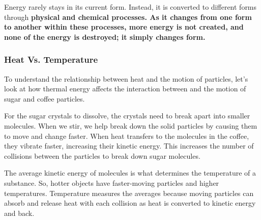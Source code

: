 Energy rarely stays in its current form. Instead, it is converted to different
forms through \bf{physical} and \bf{chemical} processes. As it changes
from one form to another within these processes, more energy is not created, and
none of the energy is destroyed; it simply changes form.

\subsubsection*{Heat Vs. Temperature}

To understand the relationship between heat and the motion of particles, let's
look at how thermal energy affects the interaction between and the motion of
sugar and coffee particles.

For the sugar crystals to dissolve, the crystals need to break apart into
smaller molecules. When we stir, we help break down the solid particles by
causing them to move and change faster. When heat transfers to the molecules in
the coffee, they vibrate faster, increasing their kinetic energy. This increases
the number of collisions between the particles to break down sugar molecules.

The average kinetic energy of molecules is what determines the temperature of a
substance. So, hotter objects have faster-moving particles and higher
temperatures. Temperature measures the averages because moving particles can
absorb and release heat with each collision as heat is converted to kinetic
energy and back.

\newpage
